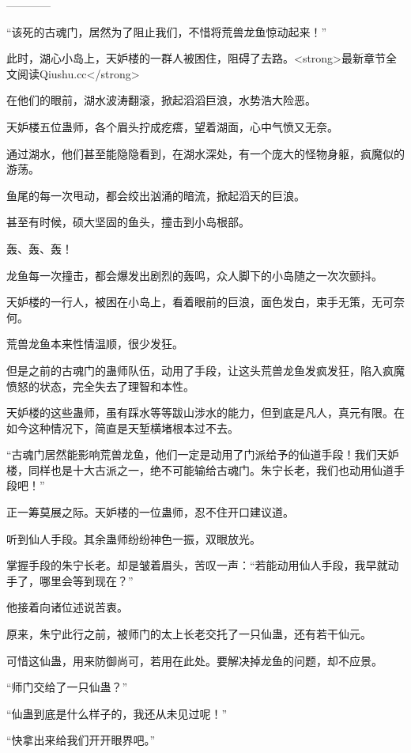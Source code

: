 
\begin{this_body}

------------

“该死的古魂门，居然为了阻止我们，不惜将荒兽龙鱼惊动起来！”

此时，湖心小岛上，天妒楼的一群人被困住，阻碍了去路。<strong>最新章节全文阅读Qiushu.cc</strong>

在他们的眼前，湖水波涛翻滚，掀起滔滔巨浪，水势浩大险恶。

天妒楼五位蛊师，各个眉头拧成疙瘩，望着湖面，心中气愤又无奈。

通过湖水，他们甚至能隐隐看到，在湖水深处，有一个庞大的怪物身躯，疯魔似的游荡。

鱼尾的每一次甩动，都会绞出汹涌的暗流，掀起滔天的巨浪。

甚至有时候，硕大坚固的鱼头，撞击到小岛根部。

轰、轰、轰！

龙鱼每一次撞击，都会爆发出剧烈的轰鸣，众人脚下的小岛随之一次次颤抖。

天妒楼的一行人，被困在小岛上，看着眼前的巨浪，面色发白，束手无策，无可奈何。

荒兽龙鱼本来性情温顺，很少发狂。

但是之前的古魂门的蛊师队伍，动用了手段，让这头荒兽龙鱼发疯发狂，陷入疯魔愤怒的状态，完全失去了理智和本性。

天妒楼的这些蛊师，虽有踩水等等跋山涉水的能力，但到底是凡人，真元有限。在如今这种情况下，简直是天堑横堵根本过不去。

“古魂门居然能影响荒兽龙鱼，他们一定是动用了门派给予的仙道手段！我们天妒楼，同样也是十大古派之一，绝不可能输给古魂门。朱宁长老，我们也动用仙道手段吧！”

正一筹莫展之际。天妒楼的一位蛊师，忍不住开口建议道。

听到仙人手段。其余蛊师纷纷神色一振，双眼放光。

掌握手段的朱宁长老。却是皱着眉头，苦叹一声：“若能动用仙人手段，我早就动手了，哪里会等到现在？”

他接着向诸位述说苦衷。

原来，朱宁此行之前，被师门的太上长老交托了一只仙蛊，还有若干仙元。

可惜这仙蛊，用来防御尚可，若用在此处。要解决掉龙鱼的问题，却不应景。

“师门交给了一只仙蛊？”

“仙蛊到底是什么样子的，我还从未见过呢！”

“快拿出来给我们开开眼界吧。”


\end{this_body}
